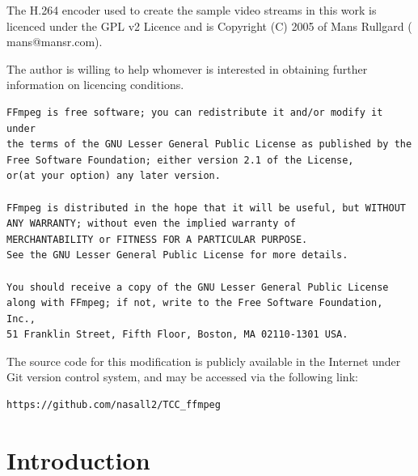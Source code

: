 \documentclass[
	12pt,				%
	openright,			%
	twoside,			%
	a4paper,			%
	brazil,
	french,				%
	english
	]{abntex2}
\begin{document}
The H.264 encoder used to create the sample video streams in this work is licenced under the GPL v2 Licence and is Copyright (C) 2005 of Mans Rullgard ( mans@mansr.com).

The author is willing to help whomever is interested in obtaining further information on licencing conditions.

\begin{lstlisting}[]
FFmpeg is free software; you can redistribute it and/or modify it under
the terms of the GNU Lesser General Public License as published by the
Free Software Foundation; either version 2.1 of the License,
or(at your option) any later version.

FFmpeg is distributed in the hope that it will be useful, but WITHOUT
ANY WARRANTY; without even the implied warranty of
MERCHANTABILITY or FITNESS FOR A PARTICULAR PURPOSE.
See the GNU Lesser General Public License for more details.

You should receive a copy of the GNU Lesser General Public License
along with FFmpeg; if not, write to the Free Software Foundation, Inc.,
51 Franklin Street, Fifth Floor, Boston, MA 02110-1301 USA.
\end{lstlisting}

The source code for this modification is publicly available in the Internet under Git version control system, and may be accessed via the following link:
\begin{verbatim}
https://github.com/nasall2/TCC_ffmpeg
\end{verbatim}
 
\chapter[Introduction]{Introduction}

\end{document}
